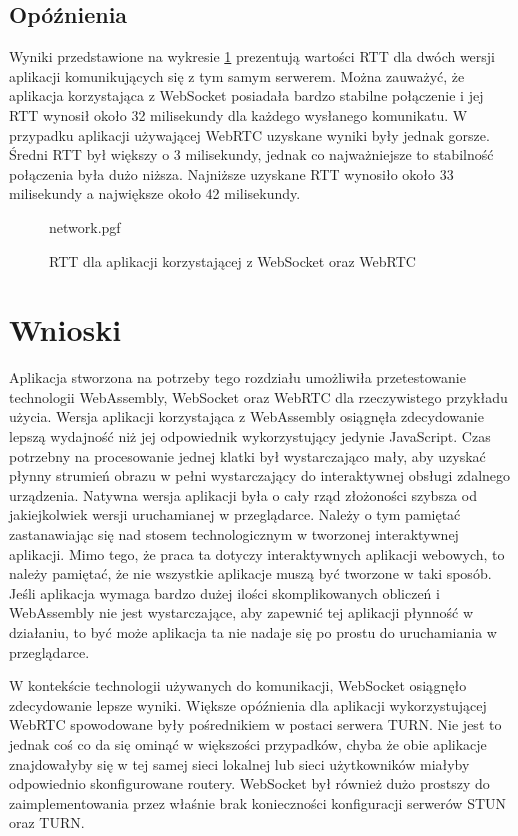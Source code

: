 \documentclass[language=polish,type=master]{aghmodern}
\begin{document}
\subsection{Opóźnienia}
Wyniki przedstawione na wykresie \ref{fig:network} prezentują wartości RTT dla dwóch wersji aplikacji komunikujących się z tym samym serwerem.
Można zauważyć, że aplikacja korzystająca z WebSocket posiadała bardzo stabilne połączenie i jej RTT wynosił około 32 milisekundy dla każdego wysłanego komunikatu.
W przypadku aplikacji używającej WebRTC uzyskane wyniki były jednak gorsze.
Średni RTT był większy o 3 milisekundy, jednak co najważniejsze to stabilność połączenia była dużo niższa.
Najniższe uzyskane RTT wynosiło około 33 milisekundy a największe około 42 milisekundy.

\begin{figure}[H]
    \centering
    {network.pgf}
    \vspace*{5pt}
    \caption{RTT dla aplikacji korzystającej z WebSocket oraz WebRTC}
    \label{fig:network}
\end{figure}

\section{Wnioski}
Aplikacja stworzona na potrzeby tego rozdziału umożliwiła przetestowanie technologii WebAssembly, WebSocket oraz WebRTC dla rzeczywistego przykładu użycia.
Wersja aplikacji korzystająca z WebAssembly osiągnęła zdecydowanie lepszą wydajność niż jej odpowiednik wykorzystujący jedynie JavaScript.
Czas potrzebny na procesowanie jednej klatki był wystarczająco mały, aby uzyskać płynny strumień obrazu w pełni wystarczający do interaktywnej obsługi zdalnego urządzenia.
Natywna wersja aplikacji była o cały rząd złożoności szybsza od jakiejkolwiek wersji uruchamianej w przeglądarce.
Należy o tym pamiętać zastanawiając się nad stosem technologicznym w tworzonej interaktywnej aplikacji.
Mimo tego, że praca ta dotyczy interaktywnych aplikacji webowych, to należy pamiętać, że nie wszystkie aplikacje muszą być tworzone w taki sposób.
Jeśli aplikacja wymaga bardzo dużej ilości skomplikowanych obliczeń i WebAssembly nie jest wystarczające, aby zapewnić tej aplikacji płynność w działaniu, to być może aplikacja ta nie nadaje się po prostu do uruchamiania w przeglądarce.

W kontekście technologii używanych do komunikacji, WebSocket osiągnęło zdecydowanie lepsze wyniki.
Większe opóźnienia dla aplikacji wykorzystującej WebRTC spowodowane były pośrednikiem w postaci serwera TURN.
Nie jest to jednak coś co da się ominąć w większości przypadków, chyba że obie aplikacje znajdowałyby się w tej samej sieci lokalnej lub sieci użytkowników miałyby odpowiednio skonfigurowane routery.
WebSocket był również dużo prostszy do zaimplementowania przez właśnie brak konieczności konfiguracji serwerów STUN oraz TURN.
\backmatter

\cleardoublepage
\renewcommand\listoflistingscaption{Spis listingów}
\listoflistings

\cleardoublepage
\listoffigures

\cleardoublepage
\printbibliography
\end{document}
